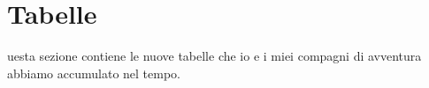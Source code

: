 \chapter{Tabelle}
uesta sezione contiene le nuove tabelle che io e i miei compagni di avventura abbiamo accumulato nel tempo.




